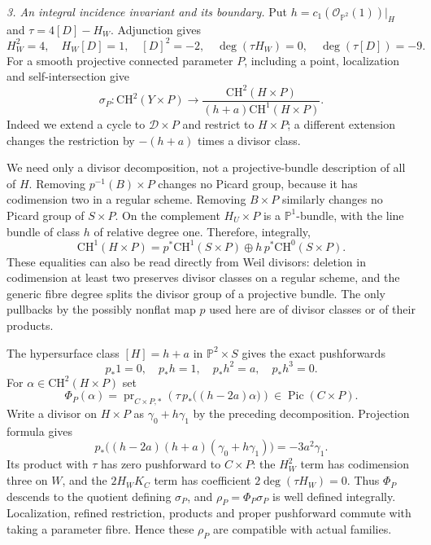 \emph{3. An integral incidence invariant and its boundary.}
Put $h=c_1(\mathcal O_{\mathbb P^2}(1))|_H$ and
$\tau=4[D]-H_W$. Adjunction gives
\[
 H_W^2=4,\quad H_W[D]=1,\quad [D]^2=-2,
 \quad \deg(\tau H_W)=0,\quad\deg(\tau[D])=-9.
\]
For a smooth projective connected parameter $P$,
including a point, localization and self-intersection
give
\[
 \sigma_P:\mathrm{CH}^2(Y\times P)\longrightarrow
 \frac{\mathrm{CH}^2(H\times P)}
             {(h+a)\mathrm{CH}^1(H\times P)}.
\]
Indeed we extend a cycle to $\mathcal D\times P$ and
restrict to $H\times P$; a different extension changes
the restriction by $-(h+a)$ times a divisor class.

We need only a divisor decomposition, not a
projective-bundle description of all of $H$. Removing
$p^{-1}(B)\times P$ changes no Picard group, because
it has codimension two in a regular scheme. Removing
$B\times P$ similarly changes no Picard group of
$S\times P$. On the complement $H_U\times P$ is a
$\mathbb P^1$-bundle, with the line bundle of class
$h$ of relative degree one. Therefore, integrally,
\[
 \mathrm{CH}^1(H\times P)=
 p^*\mathrm{CH}^1(S\times P)
       \oplus h\,p^*\mathrm{CH}^0(S\times P).
\]
These equalities can also be read directly from Weil
divisors: deletion in codimension at least two preserves
divisor classes on a regular scheme, and the generic
fibre degree splits the divisor group of a projective
bundle. The only pullbacks by the possibly nonflat
map $p$ used here are of divisor classes or of their
products.

The hypersurface class $[H]=h+a$ in
$\mathbb P^2\times S$ gives the exact pushforwards
\[
            p_*1=0,\quad p_*h=1,\quad p_*h^2=a,
                      \quad p_*h^3=0.
\]
For $\alpha\in\mathrm{CH}^2(H\times P)$ set
\[
 \Phi_P(\alpha)=\operatorname{pr}_{C\times P,*}
          \left(\tau\,p_*\bigl((h-2a)\alpha\bigr)\right)
          \in\operatorname{Pic}(C\times P).
\]
Write a divisor on $H\times P$ as $\gamma_0+h\gamma_1$
by the preceding decomposition. Projection formula gives
\[
 p_*\bigl((h-2a)(h+a)(\gamma_0+h\gamma_1)\bigr)
                         =-3a^2\gamma_1.
\]
Its product with $\tau$ has zero pushforward to
$C\times P$: the $H_W^2$ term has codimension three
on $W$, and the $2H_WK_C$ term has coefficient
$2\deg(\tau H_W)=0$. Thus $\Phi_P$ descends to the
quotient defining $\sigma_P$, and
$\rho_P=\Phi_P\sigma_P$ is well defined integrally.
Localization, refined restriction, products and proper
pushforward commute with taking a parameter fibre.
Hence these $\rho_P$ are compatible with actual families.

